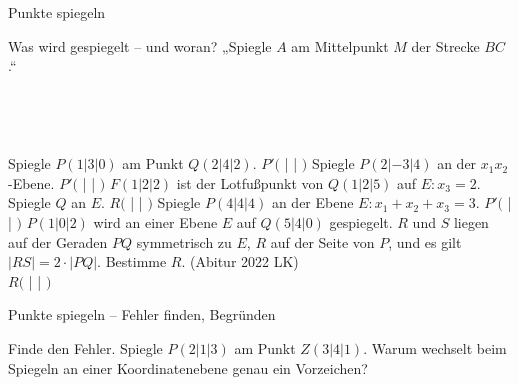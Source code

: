 \begin{aufgabe}{Punkte spiegeln}
\begin{teile}
\teil Was wird gespiegelt – und woran? „Spiegle $A$ am Mittelpunkt $M$ der Strecke $BC$.“ \\  \\  \\  \\  \\ 
\teil Spiegle $P(1 | 3 | 0)$ am Punkt $Q(2 | 4 | 2)$. $P'($ \leerfeld | \leerfeld | \leerfeld $)$
\teil Spiegle $P(2 | -3 | 4)$ an der $x_1x_2$-Ebene. $P'($ \leerfeld | \leerfeld | \leerfeld $)$
\teil $F(1 | 2 | 2)$ ist der Lotfußpunkt von $Q(1 | 2 | 5)$ auf $E: x_3 = 2$. Spiegle $Q$ an $E$. $R($ \leerfeld | \leerfeld | \leerfeld $)$
\teil Spiegle $P(4 | 4 | 4)$ an der Ebene $E: x_1 + x_2 + x_3 = 3$. $P'($ \leerfeld | \leerfeld | \leerfeld $)$
\teil $P(1 | 0 | 2)$ wird an einer Ebene $E$ auf $Q(5 | 4 | 0)$ gespiegelt. $R$ und $S$ liegen auf der Geraden $PQ$ symmetrisch zu $E$, $R$ auf der Seite von $P$, und es gilt $|RS| = 2 \cdot |PQ|$. Bestimme $R$. \hfill (Abitur 2022 LK) \\ $R($ \leerfeld | \leerfeld | \leerfeld $)$
\end{teile}
\end{aufgabe}

\begin{aufgabe}{Punkte spiegeln – Fehler finden, Begründen}
\begin{teile}
\teil Finde den Fehler. Spiegle $P(2 | 1 | 3)$ am Punkt $Z(3 | 4 | 1)$. 
\teil Warum wechselt beim Spiegeln an einer Koordinatenebene genau ein Vorzeichen?
\end{teile}
\end{aufgabe}
